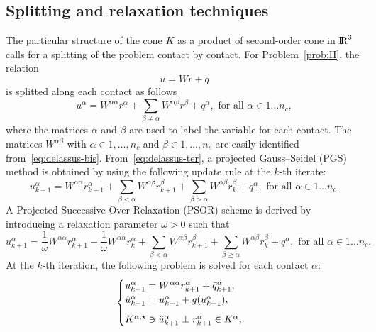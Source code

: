 \subsection{Splitting and relaxation techniques}
\label{Sec:SplittingTechniques}
 The particular structure of the cone $K$ as a product of second-order cone in $\mathrm{I\!R}^3$
 calls for a splitting of the problem contact by contact.
For Problem~\ref{prob:II}, the relation
\begin{equation}
  \label{eq:delassus-bis}
  u = W r+q
\end{equation}
is splitted along each contact as follows
\begin{equation}
  \label{eq:delassus-ter}
  u^\alpha = W^{\alpha\alpha} r^\alpha + \sum_{\beta\neq \alpha}W^{\alpha\beta} r^\beta +  q^\alpha, \text{ for all } \alpha \in 1\ldots n_c,
\end{equation}
where the matrices $\alpha$ and $\beta$ are used to label the variable for each contact.
 The matrices $W^{\alpha\beta}$ with $\alpha \in 1,\ldots, n_c$ and $\beta \in 1,\ldots, n_c $ are easily identified from~\eqref{eq:delassus-bis}.
 From~\eqref{eq:delassus-ter}, a projected Gauss--Seidel (PGS) method is obtained by using the following update rule at the $k$-th iterate:
\begin{equation}
  \label{eq:pgs-1}
  u^{\alpha}_{k+1} = W^{\alpha\alpha} r^{\alpha}_{k+1} + \sum_{\beta < \alpha}W^{\alpha\beta} r^{\beta}_{k+1} + \sum_{\beta > \alpha}W^{\alpha\beta} r^{\beta}_{k} +  q^\alpha, \text{ for all } \alpha \in 1\ldots n_c.
\end{equation}
A Projected Successive Over Relaxation (PSOR) scheme is derived by introducing a relaxation parameter $\omega>0$ such that
\begin{equation}
  \label{eq:psor-1}
  u^{\alpha}_{k+1} = \frac 1 \omega W^{\alpha\alpha} r^{\alpha}_{k+1} 
  - \frac 1 \omega W^{\alpha\alpha} r^{\alpha}_{k} +
  \sum_{\beta < \alpha}W^{\alpha\beta} r^{\beta}_{k+1} + \sum_{\beta \geq \alpha}W^{\alpha\beta} r^{\beta}_{k} +  q^\alpha, \text{ for all } \alpha \in 1\ldots n_c.
\end{equation}
At the $k$-th iteration, the following problem is solved for each contact $\alpha$:
\begin{equation}\label{eq:psor-3}
  \begin{cases}
    u^{\alpha}_{k+1} =  \Bar W^{\alpha\alpha}  r^{\alpha}_{k+1} + \bar q^{\alpha}_{k+1}, \\
    \hat u^{\alpha}_{k+1} =u^{\alpha}_{k+1} + g(u^{\alpha}_{k+1}), \\[2mm]
    K^{\alpha,\star} \ni {\hat u^{\alpha}_{k+1}} \perp r^{\alpha}_{k+1} \in K^\alpha,
  \end{cases}
\end{equation}
